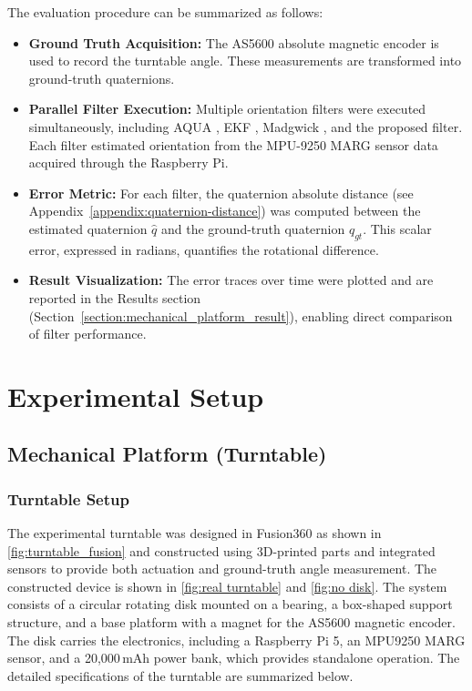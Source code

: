 \documentclass{iutbscthesis}
\begin{document}
The evaluation procedure can be summarized as follows:
\begin{itemize}
    \item \textbf{Ground Truth Acquisition:} The AS5600 absolute magnetic encoder is used to record the turntable angle. These measurements are transformed into ground-truth quaternions. 
    \item \textbf{Parallel Filter Execution:} Multiple orientation filters were executed simultaneously, including AQUA \cite{aqua_ref}, EKF \cite{maybeck1982stochastic}, Madgwick \cite{madgwick2011estimation}, and the proposed filter. Each filter estimated orientation from the MPU-9250 MARG sensor data acquired through the Raspberry Pi. 
    \item \textbf{Error Metric:} For each filter, the quaternion absolute distance (see Appendix~\ref{appendix:quaternion-distance}) was computed between the estimated quaternion $\hat{q}$ and the ground-truth quaternion $q_{gt}$. This scalar error, expressed in radians, quantifies the rotational difference. 
    \item \textbf{Result Visualization:} The error traces over time were plotted and are reported in the Results section (Section~\ref{section:mechanical_platform_result}), enabling direct comparison of filter performance. 
\end{itemize}


\chapter{Experimental Setup}\label{chapter:setup}

\section{Mechanical Platform (Turntable)}\label{section:turntable}

\subsection{Turntable Setup}

The experimental turntable was designed in Fusion360 as shown in \autoref{fig:turntable_fusion} and constructed using 3D-printed parts and integrated sensors 
to provide both actuation and ground-truth angle measurement. The constructed device is shown in \autoref{fig:real turntable} and \autoref{fig:no disk}. 
The system consists of a circular rotating disk mounted on a bearing, 
a box-shaped support structure, and a base platform with a magnet for the AS5600 magnetic encoder. 
The disk carries the electronics, including a Raspberry Pi 5, an MPU9250 MARG sensor, and a 20,000\,mAh power bank, 
which provides standalone operation. The detailed specifications of the turntable are summarized below.
\end{document}
